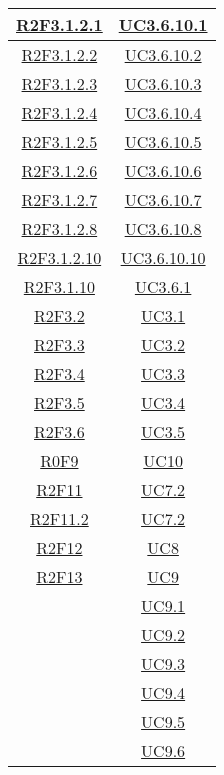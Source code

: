 \begin{longtable}{|c|c|}
\hline
\hyperlink{R2F3.1.2.1}{R2F3.1.2.1} & \hyperlink{UC3.6.10.1}{UC3.6.10.1}\\
\hline
\hyperlink{R2F3.1.2.2}{R2F3.1.2.2} & \hyperlink{UC3.6.10.2}{UC3.6.10.2}\\
\hline
\hyperlink{R2F3.1.2.3}{R2F3.1.2.3} & \hyperlink{UC3.6.10.3}{UC3.6.10.3}\\
\hline
\hyperlink{R2F3.1.2.4}{R2F3.1.2.4} & \hyperlink{UC3.6.10.4}{UC3.6.10.4}\\
\hline
\hyperlink{R2F3.1.2.5}{R2F3.1.2.5} & \hyperlink{UC3.6.10.5}{UC3.6.10.5}\\
\hline
\hyperlink{R2F3.1.2.6}{R2F3.1.2.6} & \hyperlink{UC3.6.10.6}{UC3.6.10.6}\\
\hline
\hyperlink{R2F3.1.2.7}{R2F3.1.2.7} & \hyperlink{UC3.6.10.7}{UC3.6.10.7}\\
\hline
\hyperlink{R2F3.1.2.8}{R2F3.1.2.8} & \hyperlink{UC3.6.10.8}{UC3.6.10.8}\\
\hline
\hyperlink{R2F3.1.2.10}{R2F3.1.2.10} & \hyperlink{UC3.6.10.10}{UC3.6.10.10}\\
\hline
\hyperlink{R2F3.1.10}{R2F3.1.10} & \hyperlink{UC3.6.1}{UC3.6.1}\\
\hline
\hyperlink{R2F3.2}{R2F3.2} & \hyperlink{UC3.1}{UC3.1}\\
\hline
\hyperlink{R2F3.3}{R2F3.3} & \hyperlink{UC3.2}{UC3.2}\\
\hline
\hyperlink{R2F3.4}{R2F3.4} & \hyperlink{UC3.3}{UC3.3}\\
\hline
\hyperlink{R2F3.5}{R2F3.5} & \hyperlink{UC3.4}{UC3.4}\\
\hline
\hyperlink{R2F3.6}{R2F3.6} & \hyperlink{UC3.5}{UC3.5}\\
\hline
\hyperlink{R0F9}{R0F9} & \hyperlink{UC10}{UC10}\\
\hline
\hyperlink{R2F11}{R2F11} & \hyperlink{UC7.2}{UC7.2}\\
\hline
\hyperlink{R2F11.2}{R2F11.2} & \hyperlink{UC7.2}{UC7.2}\\
\hline
\hyperlink{R2F12}{R2F12} & \hyperlink{UC8}{UC8}\\
\hline
\hyperlink{R2F13}{R2F13} & \hyperlink{UC9}{UC9}\\
& \hyperlink{UC9.1}{UC9.1}\\
& \hyperlink{UC9.2}{UC9.2}\\
& \hyperlink{UC9.3}{UC9.3}\\
& \hyperlink{UC9.4}{UC9.4}\\
& \hyperlink{UC9.5}{UC9.5}\\
& \hyperlink{UC9.6}{UC9.6}\\

\end{longtable}
